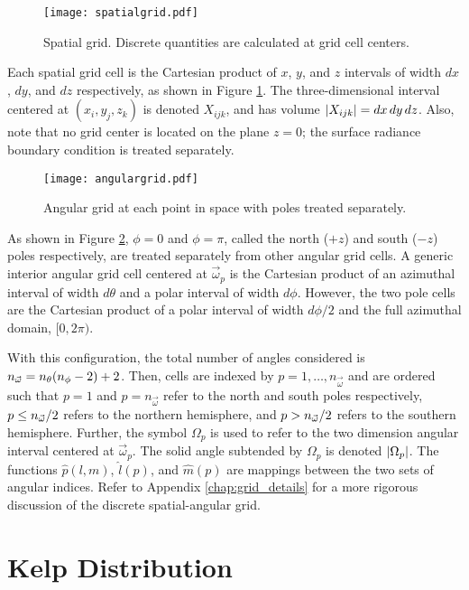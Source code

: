 \begin{figure}[H]
  \centering
  \texttt{[image: spatialgrid.pdf]}
  \caption{Spatial grid. Discrete quantities are calculated at grid cell centers.}
  \label{fig:spatial_grid}
\end{figure}

Each spatial grid cell is the Cartesian product of $x$, $y$, and $z$ intervals of width $dx$, $dy$, and $dz$ respectively,
as shown in Figure \ref{fig:spatial_grid}.
The three-dimensional interval centered at $(x_i, y_j, z_k)$ is denoted $X_{ijk}$, and has volume $\left| X_{ijk} \right|=dx\,dy\,dz$.
Also, note that no grid center is located on the plane $z=0$; the surface radiance boundary condition is treated separately.

\begin{figure}[H]
  \centering
  \texttt{[image: angulargrid.pdf]}
  \caption{Angular grid at each point in space with poles treated separately.}
  \label{fig:angular_grid}
\end{figure}

As shown in Figure \ref{fig:angular_grid}, $\phi=0$ and $\phi=\pi$, called
the north ($+z$) and south ($-z$) poles respectively, are treated separately from other angular grid cells.
A generic interior angular grid cell centered at $\vec{\omega}_p$ is the Cartesian product of an azimuthal interval of width $d\theta$ and a polar interval of width $d\phi$.
However, the two pole cells are the Cartesian product of a polar interval of width $d\phi/2$ and the full azimuthal domain, $[0, 2\pi)$.

With this configuration, the total number of angles considered is ${n_{\vec{\omega}}} = n_\theta(n_\phi-2)+2$.
Then, cells are indexed by $p=1,\ldots,n_{\vec{\omega}}$ and are ordered such that
$p=1$ and $p=n_{\vec{\omega}}$ refer to the north and south poles respectively,
$p\leq{n_{\vec{\omega}}}/2$ refers to the northern hemisphere, and $p>{n_{\vec{\omega}}}/2$ refers to the southern hemisphere.
Further, the symbol $\Omega_p$ is used to refer to the two dimension angular interval centered at $\vec{\omega}_p$.
The solid angle subtended by $\Omega_p$ is denoted $\left| \Omega_p \right|$.
The functions $\hat{p}(l,m)$, $\hat{l}(p)$, and $\hat{m}(p)$ are mappings between the two sets of angular indices.
Refer to Appendix \ref{chap:grid_details} for a more rigorous discussion of the discrete spatial-angular grid.

\section{Kelp Distribution}

